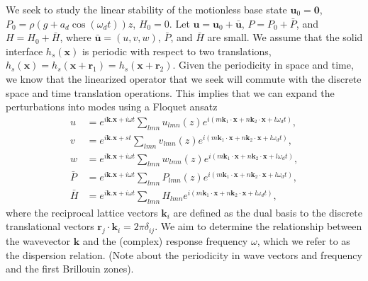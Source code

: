 \documentclass[aps,pre,amsmath,amssymb,floatfix,onecolumn,notitlepage,10pt]{revtex4-1}
\begin{document}
We seek to study the linear stability of the motionless base state $\mathbf{u}_0 = \mathbf{0}$, $P_0 = \rho(g+a_d\cos(\omega_d t))z$, $H_0=0$. Let $\mathbf{u} = \mathbf{u}_0 + \bar{\mathbf{u}}$, $P=P_0+\bar{P}$, and $H=H_0+\bar{H}$, where $\bar{\mathbf{u}} = (u,v,w)$, $\bar{P}$, and $\bar{H}$ are small.  We assume that the solid interface $h_s(\mathbf{x})$ is periodic with respect to two translations, $h_s(\mathbf{x}) = h_s(\mathbf{x}+\mathbf{r}_1) = h_s(\mathbf{x}+\mathbf{r}_2)$. Given the periodicity in space and time, we know that the linearized operator that we seek will commute with the discrete space and time translation operations. This implies \cite{2006_deconinck} that we can expand the perturbations into modes using a Floquet ansatz
\begin{align}
u &= e^{i\mathbf{k}.\mathbf{x} + i\omega t}\sum_{lmn} u_{lmn}(z) e^{i(m\mathbf{k}_1\cdot \mathbf{x} + n\mathbf{k}_2\cdot \mathbf{x} + l\omega_d t)}, \label{floq1} \\
v &= e^{i\mathbf{k}.\mathbf{x} + s t}\sum_{lmn} v_{lmn}(z) e^{i(m\mathbf{k}_1\cdot \mathbf{x} + n\mathbf{k}_2\cdot \mathbf{x} + l\omega_d t)}, \label{floq2} \\
w &= e^{i\mathbf{k}.\mathbf{x} + i\omega t}\sum_{lmn} w_{lmn}(z) e^{i(m\mathbf{k}_1\cdot \mathbf{x} + n\mathbf{k}_2\cdot \mathbf{x} + l\omega_d t)}, \label{floq3} \\
\bar{P} &= e^{i\mathbf{k}.\mathbf{x} + i\omega t}\sum_{lmn} P_{lmn}(z) e^{i(m\mathbf{k}_1\cdot \mathbf{x} + n\mathbf{k}_2\cdot \mathbf{x} + l\omega_d t)}, \label{floq4} \\
\bar{H} &= e^{i\mathbf{k}.\mathbf{x} + i\omega t}\sum_{lmn} H_{lmn} e^{i(m\mathbf{k}_1\cdot \mathbf{x} + n\mathbf{k}_2\cdot \mathbf{x} + l\omega_d t)},  \label{floq5}
\end{align}
where the reciprocal lattice vectors $\mathbf{k}_i$ are defined as the dual basis to the discrete translational vectors $\mathbf{r}_j \cdot \mathbf{k}_i = 2\pi\delta_{ij}$. We aim to determine the relationship between the wavevector $\mathbf{k}$ and the (complex) response frequency $\omega$, which we refer to as the dispersion relation. (Note about the periodicity in wave vectors and frequency and the first Brillouin zones).
\end{document}
